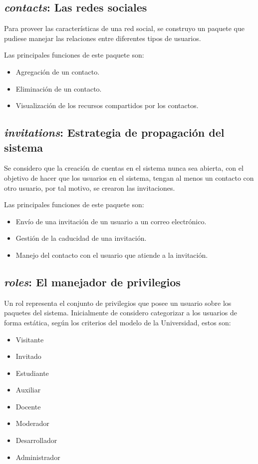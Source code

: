 \subsection{\emph{contacts}: Las redes sociales}
Para proveer las características de una red social, se construyo un paquete que
pudiese manejar las relaciones entre diferentes tipos de usuarios.

Las principales funciones de este paquete son:

\begin{itemize}
\item Agregación de un contacto.
\item Eliminación de un contacto.
\item Visualización de los recursos compartidos por los contactos.
\end{itemize}

\subsection{\emph{invitations}: Estrategia de propagación del sistema}
Se considero que la creación de cuentas en el sistema nunca sea abierta, con el
objetivo de hacer que los usuarios en el sistema, tengan al menos un contacto
con otro usuario, por tal motivo, se crearon las invitaciones.

Las principales funciones de este paquete son:

\begin{itemize}
\item Envío de una invitación de un usuario a un correo electrónico.
\item Gestión de la caducidad de una invitación.
\item Manejo del contacto con el usuario que atiende a la invitación.
\end{itemize}

\subsection{\emph{roles}: El manejador de privilegios}
Un rol representa el conjunto de privilegios que posee un usuario sobre los
paquetes del sistema.
Inicialmente de considero categorizar a los usuarios de forma estática, según
los criterios del modelo de la Universidad, estos son:

\begin{itemize}
\item Visitante
\item Invitado
\item Estudiante
\item Auxiliar
\item Docente
\item Moderador
\item Desarrollador
\item Administrador
\end{itemize}

